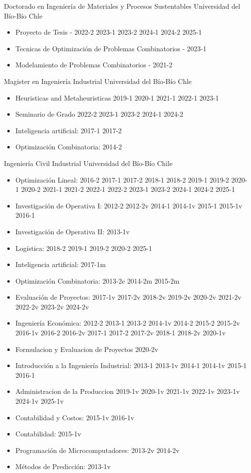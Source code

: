 {Doctorado en Ingenier\'ia de Materiales y Procesos Sustentables}
{Universidad del B\'io-B\'io}
{Chle}
{}
{\begin{itemize}
\item Proyecto de Tesis - 2022-2 2023-1 2023-2 2024-1 2024-2 2025-1
\item Tecnicas de Optimizaci\'on de Problemas Combinatorios - 2023-1
\item Modelamiento de Problemas Combinatorios - 2021-2
\end{itemize}}

{Magister en Ingenier\'ia Industrial}
{Universidad del B\'io-B\'io}
{Chle}
{}
{\begin{itemize}
\item Heuristicas and Metaheuristicas 2019-1 2020-1 2021-1 2022-1 2023-1
\item Seminario de Grado 2022-2 2023-1 2023-2 2024-1 2024-2
\item Inteligencia artificial: 2017-1 2017-2
\item Optimizaci\'on Combinatoria: 2014-2
\end{itemize}}

{Ingenier\'ia Civil Industrial}
{Universidad del B\'io-B\'io}
{Chile}
{}
{\begin{itemize}
\item Optimizaci\'on Lineal: 2016-2 2017-1 2017-2 2018-1 2018-2 2019-1 2019-2 2020-1 2020-2 2021-1 2021-2 2022-1 2022-2 2023-1 2023-2 2024-1 2024-2 2025-1
\item Investigaci\'on de Operativa I: 2012-2 2012-2v 2014-1 2014-1v 2015-1 2015-1v 2016-1
\item Investigaci\'on de Operativa II: 2013-1v
\item Log\'istica: 2018-2 2019-1 2019-2 2020-2 2025-1
\item Inteligencia artificial: 2017-1m
\item Optimizaci\'on Combinatoria: 2013-2e 2014-2m 2015-2m
\item Evaluaci\'on de Proyectos: 2017-1v 2017-2v 2018-2v 2019-2v 2020-2v 2021-2v 2022-2v 2023-2v 2024-2v
\item Ingenier\'ia Econ\'omica: 2012-2 2013-1 2013-2 2014-1v 2014-2 2015-2 2015-2v 2016-1v 2016-2 2016-2v 2017-1 2017-2 2017-2v 2018-1 2018-2v 2020-1v
\item Formulacion y Evaluacion de Proyectos 2020-2v
\item Introducci\'on a la Ingenier\'ia Industrial: 2013-1 2013-1v 2014-1 2014-1v 2015-1 2016-1
\item Administracion de la Produccion 2019-1v 2020-1v 2021-1v 2022-1v 2023-1v 2024-1v 2025-1v
\item Contabilidad y Costos: 2015-1v 2016-1v
\item Contabilidad: 2015-1v
\item Programaci\'on de Microcomputadores: 2013-2v 2014-2v
\item M\'etodos de Predicci\'on: 2013-1v
\end{itemize}}

